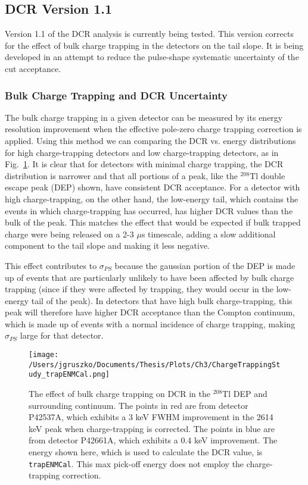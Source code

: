 \subsection{DCR Version 1.1}\label{ssec:dcr_ct}
Version 1.1 of the DCR analysis is currently being tested. This version corrects for the effect of bulk charge trapping in the detectors on the tail slope. It is being developed in an attempt to reduce the pulse-shape systematic uncertainty of the cut acceptance. 
 
\subsubsection{Bulk Charge Trapping and DCR Uncertainty}
The bulk charge trapping in a given detector can be measured by its energy resolution improvement when the effective pole-zero charge trapping correction is applied. Using this method we can comparing the DCR vs. energy distributions for high charge-trapping detectors and low charge-trapping detectors, as in Fig.~\ref{fig:ct_DCRvE}. It is clear that for detectors with minimal charge trapping, the DCR distribution is narrower and that all portions of a peak, like the $^{208}$Tl double escape peak (DEP) shown, have consistent DCR acceptance. For a detector with high charge-trapping, on the other hand, the low-energy tail, which contains the events in which charge-trapping has occurred, has higher DCR values than the bulk of the peak. This matches the effect that would be expected if bulk trapped charge were being released on a 2-3 $\mu$s timescale, adding a slow additional component to the tail slope and making it less negative. 

This effect contributes to $\sigma_{PS}$ because the gaussian portion of the DEP is made up of events that are particularly unlikely to have been affected by bulk charge trapping (since if they were affected by trapping, they would occur in the low-energy tail of the peak). In detectors that have high bulk charge-trapping, this peak will therefore have higher DCR acceptance than the Compton continuum, which is made up of events with a normal incidence of charge trapping, making $\sigma_{PS}$ large for that detector. 

\begin{figure}[]
 \centering
 \texttt{[image: /Users/jgruszko/Documents/Thesis/Plots/Ch3/ChargeTrappingStudy\_trapENMCal.png]}
 \caption[The effect of bulk charge trapping on DCR in the $^{208}$Tl DEP and surrounding continuum.]{The effect of bulk charge trapping on DCR in the $^{208}$Tl DEP and surrounding continuum. The points in red are from detector P42537A, which exhibits a 3 keV FWHM improvement in the 2614 keV peak when charge-trapping is corrected. The points in blue are from detector P42661A, which exhibits a 0.4 keV improvement. The energy shown here, which is used to calculate the DCR value, is {\tt trapENMCal}. This max pick-off energy does not employ the charge-trapping correction.} 
 \label{fig:ct_DCRvE}
\end{figure}

